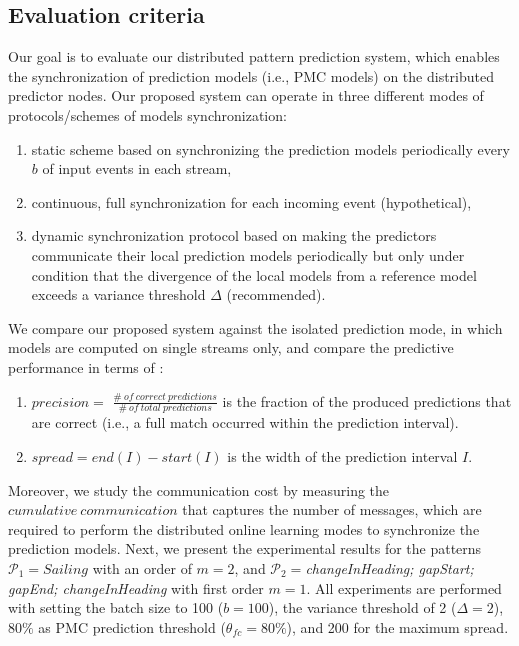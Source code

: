 \subsection*{Evaluation criteria} Our goal is to evaluate our distributed pattern prediction system, which enables the synchronization of prediction models (i.e., PMC models) on the distributed predictor nodes. Our proposed system can operate in three different modes of  protocols/schemes of models synchronization: \begin{enumerate}[]
	\item static scheme based on synchronizing the prediction models periodically every $b$ of input events in each stream, 
\item continuous, full synchronization for each incoming event (hypothetical), 
\item dynamic synchronization protocol based on making the predictors communicate their local prediction models periodically but only under condition that the divergence of the local models from a reference model exceeds a variance threshold $\Delta$ (recommended).  	   

\end{enumerate}
\par We compare our proposed system against the isolated prediction mode, in which models are computed on single streams only, and compare the predictive performance in terms of :
\begin{enumerate}[]
	
\item  $\mathit{precision} =$ $ \mathit{\frac{\#\ of\ correct\ predictions}{\#\ of\ total\ predictions}}$ is the fraction of the produced predictions that are correct (i.e., a full match occurred within the prediction interval).   

\item $\mathit{spread} =end(I) -start(I)$ is the width of the prediction interval $I$. 

\end{enumerate} 
\par Moreover, we study the communication cost by measuring the $\mathit{cumulative\ communication}$ that captures the number of messages, which are required to perform the distributed online learning modes to synchronize the prediction models. Next, we present the experimental results for the patterns  $\mathcal{P}_1=Sailing$ with an order of $m=2$, and   $\mathcal{P}_2=$\textit{changeInHeading; gapStart; gapEnd; changeInHeading} with first order $m=1$. All experiments are performed with setting the batch size to 100  ($b=100$), the variance threshold of 2 ($\Delta=2$), $80\%$ as PMC prediction threshold ($\theta_{fc}=80\%$), and 200 for the maximum spread.

